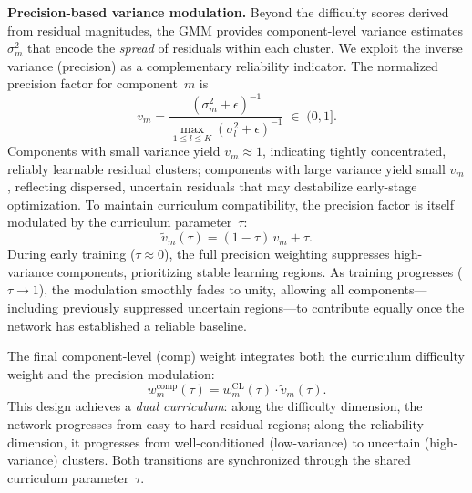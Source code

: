 \documentclass{article}
\theoremstyle{plain}
\theoremstyle{definition}
\theoremstyle{remark}
\begin{document}
	\textbf{Precision-based variance modulation.}\;
	Beyond the difficulty scores derived from residual magnitudes, the GMM
	provides component-level variance estimates $\sigma_m^2$ that encode the
	\emph{spread} of residuals within each cluster. We exploit the
	inverse variance (precision) as a complementary reliability indicator.
	The normalized precision factor for component~$m$ is
	\begin{equation}
		v_m
		= \frac{(\sigma_m^2+\epsilon)^{-1}}
		{\max_{1\leqslant l\leqslant K}(\sigma_l^2+\epsilon)^{-1}}
		\;\in\;(0,1].
		\label{eq:precision_factor}
	\end{equation}
	Components with small variance yield $v_m\!\approx\!1$,
	indicating tightly concentrated, reliably learnable residual clusters;
	components with large variance yield small $v_m$, reflecting dispersed,
	uncertain residuals that may destabilize early-stage optimization.
	To maintain curriculum compatibility, the precision factor is itself
	modulated by the curriculum parameter~$\tau$:
	\begin{equation}
		\tilde{v}_m(\tau) = (1-\tau)\,v_m + \tau.
		\label{eq:effective_precision}
	\end{equation}
	During early training ($\tau\!\approx\!0$), the full precision weighting
	suppresses high-variance components, prioritizing stable learning
	regions. As training progresses ($\tau\!\to\!1$), the modulation
	smoothly fades to unity, allowing all components---including
	previously suppressed uncertain regions---to contribute equally once
	the network has established a reliable baseline.
	
	The final component-level (comp) weight integrates both the curriculum
	difficulty weight and the precision modulation:
	\begin{equation}
		w_m^{\mathrm{comp}}(\tau)
		= w_m^{\mathrm{CL}}(\tau)\cdot\tilde{v}_m(\tau).
		\label{eq:combined_weight}
	\end{equation}
	This design achieves a \emph{dual curriculum}: along the difficulty
	dimension, the network progresses from easy to hard residual regions;
	along the reliability dimension, it progresses from well-conditioned
	(low-variance) to uncertain (high-variance) clusters. Both transitions
	are synchronized through the shared curriculum parameter~$\tau$.
	
\end{document}
